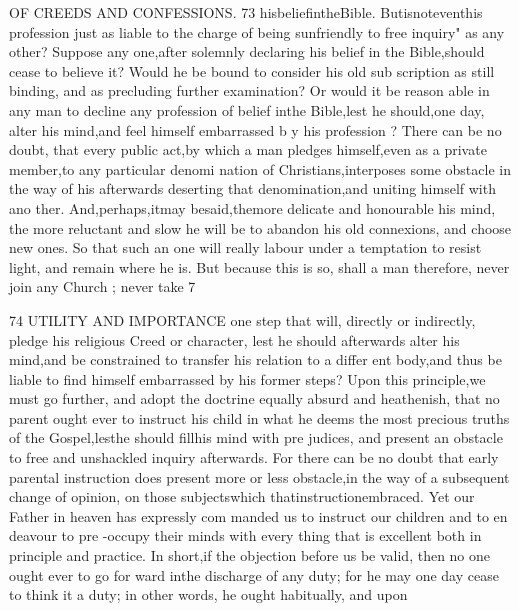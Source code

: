 \documentclass[
]{book}
\begin{document}
OF CREEDS AND CONFESSIONS. 73
hisbeliefintheBible. Butisnoteventhis
profession just as liable to the charge of being sunfriendly to free inquiry" as any other? Suppose any one,after solemnly declaring his belief in the Bible,should cease to believe it? Would he be bound to consider his old sub
scription as still binding, and as precluding further examination? Or would it be reason
able in any man to decline any profession of belief inthe Bible,lest he should,one day,
alter his mind,and feel himself embarrassed b y his profession ?
There can be no doubt, that every public
act,by which a man pledges himself,even as a private member,to any particular denomi
nation of Christians,interposes some obstacle in the way of his afterwards deserting that
denomination,and uniting himself with ano ther. And,perhaps,itmay besaid,themore delicate and honourable his mind, the more reluctant and slow he will be to abandon his old connexions, and choose new ones. So
that such an one will really labour under a temptation to resist light, and remain where he is. But because this is so, shall a man
therefore, never join any Church ; never take
7

74 UTILITY AND IMPORTANCE
one step that will, directly or indirectly, pledge his religious Creed or character, lest he should afterwards alter his mind,and be constrained to transfer his relation to a differ ent body,and thus be liable to find himself embarrassed by his former steps? Upon this principle,we must go further, and adopt the
doctrine equally absurd and heathenish, that no parent ought ever to instruct his child in
what he deems the most precious truths of the Gospel,lesthe should fillhis mind with pre judices, and present an obstacle to free and
unshackled inquiry afterwards. For there can be no doubt that early parental instruction does present more or less obstacle,in the way of a subsequent change of opinion, on those subjectswhich thatinstructionembraced. Yet our Father in heaven has expressly com manded us to instruct our children and to en deavour to pre -occupy their minds with every thing that is excellent both in principle and practice. In short,if the objection before us be valid, then no one ought ever to go for ward inthe discharge of any duty; for he
may one day cease to think it a duty; in other words, he ought habitually, and upon
\end{document}
